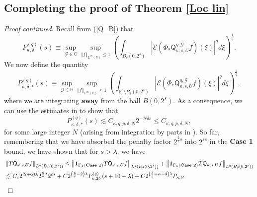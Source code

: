 \documentclass{amsart}%
\theoremstyle{plain}
\numberwithin{equation}{section}
\begin{document}
\subsection{Completing the proof of Theorem \ref{Loc lin}}

\begin{proof}
[Proof continued]Recall from (\ref{Q_R}) that
\[
P_{\kappa,\delta}^{\left(  q\right)  }\left(  s\right)  \equiv\sup
_{\mathcal{G}\in\mathbb{G}}\sup_{\left\Vert f\right\Vert _{L^{\infty}\left(
U\right)  }\leq1}\left(  \int_{B_{\delta}\left(  0,2^{s}\right)  }\left\vert
\mathcal{E}\left(  \Phi_{\ast}\mathsf{Q}_{\kappa,s,U}^{\eta,\mathcal{G}%
}f\right)  \left(  \xi\right)  \right\vert ^{q}d\xi\right)  ^{\frac{1}{q}}.
\]
We now define the quantity%
\[
P_{\kappa,\delta,\ast}^{\left(  q\right)  }\left(  s\right)  \equiv
\sup_{\mathcal{G}\in\mathbb{G}}\sup_{\left\Vert f\right\Vert _{L^{\infty
}\left(  U\right)  }\leq1}\left(  \int_{\mathbb{R}^{3}\setminus B_{\delta
}\left(  0,2^{s}\right)  }\left\vert \mathcal{E}\left(  \Phi_{\ast}%
\mathsf{Q}_{\kappa,s,U}^{\eta,\mathcal{G}}f\right)  \left(  \xi\right)
\right\vert ^{q}d\xi\right)  ^{\frac{1}{q}},
\]
where we are integrating \textbf{away} from the ball $B\left(  0,2^{s}\right)
$. As a consequence, we can use the estimates in \cite[see Case 2 of the proof
of Theorem 10]{RiSa} to show that%
\[
P_{\kappa,\delta,\ast}^{\left(  q\right)  }\left(  s\right)  \lesssim
C_{\kappa,q,p,\delta,N}2^{-N\delta s}\leq C_{\kappa,q,p,\delta,N},
\]
for some large integer $N$ (arising from integration by parts in \cite{RiSa}).
So far, remembering that we have absorbed the penalty factor $2^{\frac{2}{r}%
s}$ into $2^{\varepsilon s}$ in the \textbf{Case 1} bound, we have shown that
for $s>\lambda$, we have%
\begin{align*}
&  \left\Vert T\mathsf{Q}_{\kappa,s,U}f\right\Vert _{L^{q}\left(  B_{\delta
}\left(  0,2^{s}\right)  \right)  }\leq\left\Vert \mathbf{1}_{\Gamma_{\lambda
}\left(  \text{\textbf{Case 1}}\right)  }T\mathsf{Q}_{\kappa,s,U}f\right\Vert
_{L^{q}\left(  B_{\delta}\left(  0,2^{s}\right)  \right)  }+\left\Vert
\mathbf{1}_{\Gamma_{\lambda}\left(  \text{\textbf{Case 2}}\right)
}T\mathsf{Q}_{\kappa,s,U}f\right\Vert _{L^{q}\left(  B_{\delta}\left(
0,2^{s}\right)  \right)  }\\
&  \lesssim C_{\varepsilon}2^{\left(  2+\alpha\right)  \lambda}2^{\frac{6}%
{q}\lambda}2^{\varepsilon s}+C2^{\left(  \frac{6}{q}-2\right)  \lambda
}P_{\kappa,2\delta}^{\left(  q\right)  }\left(  s+10-\lambda\right)
+C2^{\left(  \frac{3}{q}+\alpha-4\right)  \lambda}P_{\kappa,\delta^{\prime}%
}
\end{align*}
\end{proof}
\end{document}
